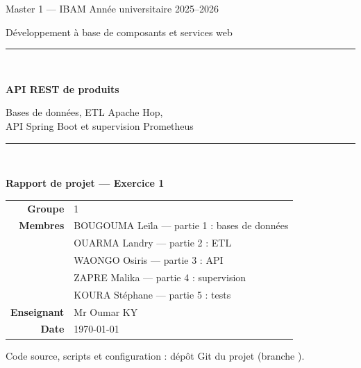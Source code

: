 \documentclass[11pt,a4paper]{article}
\newcommand{\code}[1]{\texttt{\detokenize{#1}}}
\begin{document}
\begin{titlepage}
\centering
\vspace*{1cm}
{\large Master 1 --- IBAM \hfill Année universitaire 2025--2026\par}
\vspace{0.4cm}
{\large Développement à base de composants et services web\par}
\vspace{2.2cm}
\rule{\textwidth}{0.6pt}\\[0.5cm]
{\Huge\bfseries API REST de produits\par}
\vspace{0.4cm}
{\Large Bases de données, ETL Apache Hop,\\ API Spring Boot et supervision Prometheus\par}
\rule{\textwidth}{0.6pt}\\[1.2cm]
{\large\bfseries Rapport de projet --- Exercice 1\par}
\vspace{2cm}
\begin{tabular}{rl}
  \textbf{Groupe} & 1 \\[4pt]
  \textbf{Membres} & BOUGOUMA Leïla --- partie 1 : bases de données \\
                   & OUARMA Landry --- partie 2 : ETL \\
                   & WAONGO Osiris --- partie 3 : API \\
                   & ZAPRE Malika --- partie 4 : supervision \\
                   & KOURA Stéphane --- partie 5 : tests \\[4pt]
  \textbf{Enseignant} & Mr Oumar KY \\[4pt]
  \textbf{Date} & \today
\end{tabular}
\vfill
{\small Code source, scripts et configuration : dépôt Git du projet (branche \code{main}).\par}
\end{titlepage}

\begin{abstract}
\noindent
Ce rapport présente la réalisation d'une chaîne complète de traitement de données de produits.
Des données brutes et volontairement imparfaites, stockées dans MySQL, sont contrôlées, normalisées
et dédoublonnées par un ETL Apache Hop, puis chargées dans PostgreSQL. Une API REST Spring Boot expose
ces données (consultation paginée, création, modification, suppression) avec un contrat OpenAPI,
une validation stricte et un format d'erreur unique. Prometheus supervise l'API en continu.
L'ensemble est décrit par un seul fichier Docker Compose et se lance sur n'importe quelle machine
disposant de Docker. Sur le jeu de test de 40 lignes, l'ETL charge 29 produits et en rejette 10 avec
un motif précis ; l'API est couverte par 27 tests automatisés et par une collection Bruno de 18 requêtes.
\end{abstract}
\clearpage
\end{document}
